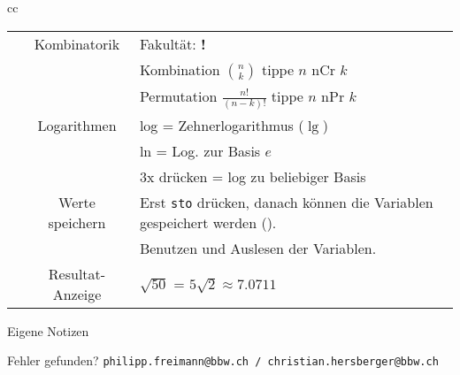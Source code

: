 \begin{tabular}{cc}
\begin{tabular}{c|c|p{80mm}}
\tiprobutton{ncrnpr}       &Kombinatorik      &  Fakultät: {\color{red}\textbf{!}}\\
                           &                  &  Kombination $n \choose k$ tippe $n$ nCr $k$\\
                           &                  &  Permutation $\frac{n!}{(n-k)!}$ tippe $n$ nPr $k$\\\hline
\tiprobutton{ln_log}       &  Logarithmen     &  log = Zehnerlogarithmus ($\lg$)\\
                           &                  &  ln  = Log. zur Basis $e$\\
                           &                  &  3x drücken = log zu beliebiger Basis\\\hline
\tiprobutton{sto_recall}   & Werte speichern  &  Erst \texttt{sto} drücken, danach können die Variablen gespeichert werden (\tiprobutton{xyzabcd}). \\\hline
\tiprobutton{xyzabcd}      &                  & Benutzen und Auslesen der Variablen.\\\hline
\tiprobutton{approx}       & Resultat-Anzeige  & $\sqrt{50}$ = $5\sqrt{2} \approx 7.0711$
\end{tabular}
\end{tabular}

\headerUndFooterJedeSeite{}

%
\noTRAINER{\vspace{15mm}}%
%
%
\headerUndFooterJedeSeite{}
\newpage
\headerUndFooterJedeSeite{}


Eigene Notizen\\

%
%
%
\vspace{5mm}

Fehler gefunden? \texttt{philipp.freimann@bbw.ch / christian.hersberger@bbw.ch}

\tiny{\versionsnummerFoSa}





